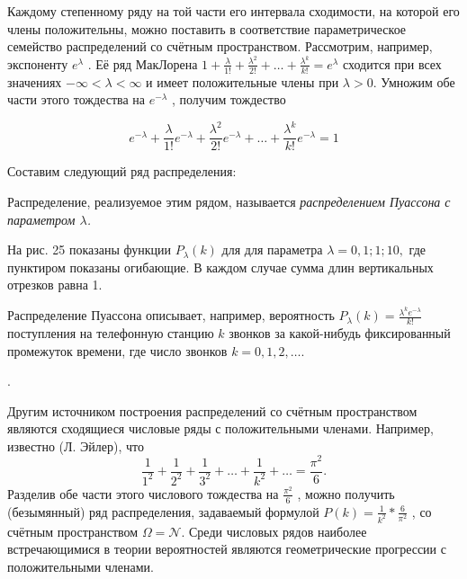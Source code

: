 \begin{zam}
Каждому степенному ряду на той части его интервала
сходимости, на которой его члены положительны, можно поставить в соответствие параметрическое семейство распределений со счётным пространством.
Рассмотрим, например, экспоненту $e^\lambda$ . Её ряд МакЛорена
$1+ \frac{\lambda}{1!} + \frac{\lambda^2}{2!} + \ldots + \frac{\lambda^k}{k!} = e^\lambda$
сходится при всех значениях $−\infty < \lambda < \infty$ и имеет положительные члены при $\lambda > 0$. Умножим обе части этого тождества на $e^{−\lambda}$ , получим тождество

$$e^{−\lambda}+ \frac{\lambda}{1!} e^{−\lambda} + \frac{\lambda^2}{2!} e^{−\lambda}+ \ldots + \frac{\lambda^k}{k!} e^{−\lambda}= 1$$

Составим следующий ряд распределения:
\begin{table}
\end{table}




\end{zam}

\begin{definition}
Распределение, реализуемое этим рядом, называется \textit{распределением Пуассона с параметром $\lambda$.}

На рис. 25 показаны функции $P_\lambda (k)$ для для параметра $\lambda = 0, 1; 1; 10,$ где
пунктиром показаны огибающие. В каждом случае сумма длин вертикальных отрезков равна 1.

Распределение Пуассона описывает, например, вероятность $P_\lambda (k) = \frac{\lambda^k e^{-\lambda}}{k!}$
поступления на телефонную станцию $k$ звонков за какой-нибудь фиксированный промежуток времени, где число звонков $k = 0, 1, 2, \ldots .$
\end{definition}. 

\begin{zam}
Другим источником построения распределений со счётным пространством являются сходящиеся числовые ряды с положительными членами. Например, известно (Л. Эйлер), что
$$\frac{1}{1^2} + \frac{1}{2^2} + \frac{1}{3^2} + \ldots + \frac{1}{k^2} + \ldots = \frac{\pi^2}{6}.$$
Разделив обе части этого числового тождества на $\frac{\pi^2}{6}$ , можно получить (безымянный) ряд распределения, задаваемый формулой $P(k) = \frac{1}{k^2} * \frac{6}{\pi^2}$ , со счётным пространством $\Omega = \mathcal{N}$.
Среди числовых рядов наиболее встречающимися в теории вероятностей являются геометрические прогрессии с положительными членами.
\end{zam}


